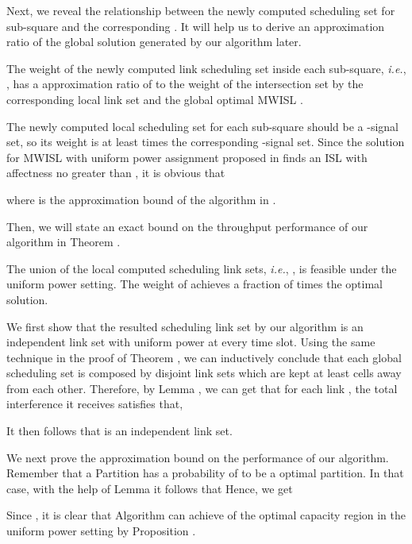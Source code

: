 \documentclass[journal]{IEEEtran}
\begin{document}
Next, we reveal the relationship between the newly computed scheduling set  for sub-square and the corresponding . It will help us to derive an approximation ratio of the global solution generated by our algorithm later.
\begin{lemma}
The weight of the newly computed link scheduling  set inside each sub-square,
\emph{i.e.}, ,  has a  approximation ratio of  to
the weight of the intersection set by the corresponding local link set  and the global optimal MWISL .
\label{lemma6}
\end{lemma}
\begin{IEEEproof}
 The newly computed local scheduling set for each sub-square should be a -signal set, so its weight is at least  times the corresponding -signal set. Since the solution for MWISL with uniform power assignment proposed in \cite{S:phy9} finds an ISL with affectness no greater than , it is obvious that

where  is the approximation bound of the algorithm in \cite{S:phy9}.
\end{IEEEproof}

Then, we will state an exact bound on the throughput performance of our algorithm in Theorem .
\begin{theorem}
\label{theorem2}
The union of the local computed scheduling link sets, \emph{i.e.},
,  is feasible under the uniform power setting. The weight of  achieves a fraction of  times the optimal solution.
\end{theorem}
\begin{IEEEproof}
We first show that the resulted scheduling link set by our algorithm is an independent link set with uniform power at every time slot.
 Using the same technique in the proof of Theorem , we can inductively conclude that each global scheduling set  is
 composed by disjoint link sets which are kept at least  cells away from each other. Therefore, by Lemma , we can get that
 for each link , the total interference it receives satisfies that,
 
It then follows that  is an independent link set.

We next prove the approximation bound on the performance of our algorithm. Remember that a Partition has a probability of  to be a optimal partition. In that case, with the help of Lemma  it follows that
{\small{}}
Hence, we get
{\small{
}}

Since  , it is clear that Algorithm  can achieve  of the optimal capacity region in the uniform power setting by Proposition .
\end{IEEEproof}
\end{document}

